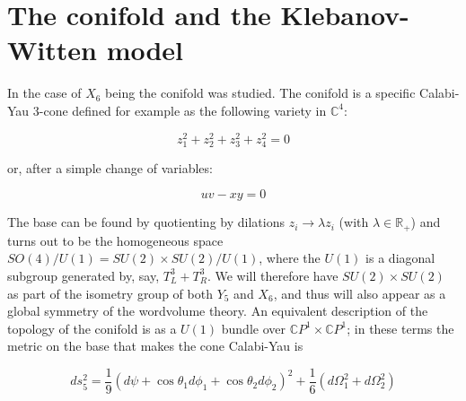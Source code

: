 
\begin{figure}[!h]
	\centering
{}
\end{figure}


\section{The conifold and the Klebanov-Witten model} \label{sec:KW}

In \cite{KW_SCFT} the case of $X_6$ being the conifold was studied. The conifold is a specific Calabi-Yau 3-cone defined for example as the following variety in $\mathbb{C}^4$:

\begin{equation}
	z_1^2 + z_2^2 + z_3^2 + z_4^2 = 0
\end{equation}

or, after a simple change of variables:

\begin{equation}
	u v - xy = 0
	\label{}
\end{equation}

The base can be found by quotienting by dilations $z_i \rightarrow \lambda z_i$ (with $\lambda \in \mathbb{R}_+$) and turns out to be the homogeneous space $SO(4)/U(1) = SU(2)\times SU(2) / U(1)$, where the $U(1)$ is a diagonal subgroup generated by, say, $T^3_L + T^3_R$. We will therefore have $SU(2)\times SU(2)$ as part of the isometry group of both $Y_5$ and $X_6$, and thus will also appear as a global symmetry of the wordvolume theory. An equivalent description of the topology of the conifold is as a $U(1)$ bundle over $\mathbb{C}P^1 \times \mathbb{C}P^1$; in these terms the metric on the base that makes the cone Calabi-Yau is

\begin{equation}
	ds^2_5 = \frac{1}{9} (d\psi + \cos\theta_1 d\phi_1 + \cos\theta_2 d\phi_2)^2 + \frac{1}{6} (d\Omega_1^2 + d\Omega_2^2)
\end{equation}

